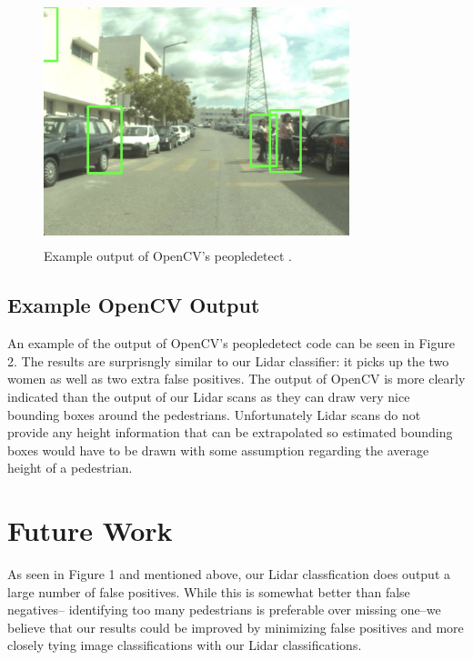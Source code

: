 \documentclass[10pt,twocolumn,letterpaper]{article}
\begin{document}
  \begin{figure}
    \includegraphics[height=2.8in, width=3.5in]{images/peopledetect.png}
    \caption{ Example output of OpenCV's peopledetect \cite{opencv}. }
  \end{figure}

  \subsection{Example OpenCV Output}
  An example of the output of OpenCV's peopledetect \cite{opencv} code can be seen in Figure 2.
  The results are surprisngly similar to our Lidar classifier: it picks up the two
  women as well as two extra false positives. The output of OpenCV is more clearly
  indicated than the output of our Lidar scans as they can draw very nice bounding
  boxes around the pedestrians. Unfortunately Lidar scans do not provide any height
  information that can be extrapolated so estimated bounding boxes would have to be
  drawn with some assumption regarding the average height of a pedestrian.

\section{Future Work}
  As seen in Figure 1 and mentioned above, our Lidar classfication does output a
  large number of false positives. While this is somewhat better than false negatives--
  identifying too many pedestrians is preferable over missing one--we believe that
  our results could be improved by minimizing false positives and more closely
  tying image classifications with our Lidar classifications.
\end{document}
